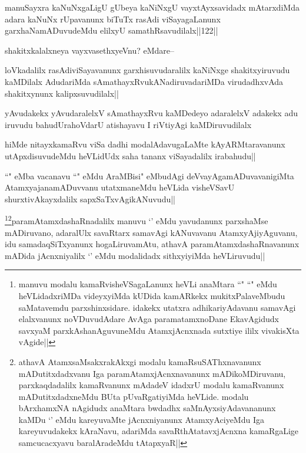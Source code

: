 \begin{artha}
manuSayxra kaNuNxgaLigU gUbeya kaNiNxgU vayxtAyxsavidadx mAtarxdiMda adara kaNuNx rUpavanunx biTuTx rasAdi viSayagaLanunx garxhaNamADuvudeMdu elilxyU samathRsavudilalx||122||
\end{artha}

\begin{artha}
shakitxkalalxneya vayxvasethxyeVnu? eMdare--
\end{artha}

\begin{artha}
loVkadalilx rasAdiviSayavanunx garxhisuvudaralilx kaNiNxge shakitxyiruvudu kaMDilalx AdudariMda sAmathayxRvukANadiruvadariMDa virudadhxvAda shakitxynunx kalipxsuvudilalx||
\end{artha}

\begin{artha}
yAvudakekx yAvudaralelxV sAmathayxRvu kaMDedeyo adaralelxV adakekx adu iruvudu bahudUrahoVdarU atishayavu I riVtiyAgi kaMDiruvudilalx
\end{artha}

\begin{artha}
hiMde nitayxkamaRvu viSa dadhi modalAdavugaLaMte kAyARMtaravanunx utApxdisuvudeMdu heVLidUdx saha tananx viSayadalilx irabahudu||
\end{artha}

\begin{artha}
``\stext" eMba vacanavu ``\stext" eMdu AraMBisi" eMbudAgi  deVvayAgamADuvavanigiMta AtamxyajanamADuvvanu utatxmaneMdu heVLida visheVSavU shurxtivAkayxdalilx sapxSaTxvAgikANuvudu||
\end{artha}

\begin{artha}
\footnote{manuvu modalu kamaRvisheVSagaLanunx heVLi anaMtara ``\stext" ``\stext" eMdu heVLidadxriMDa videyxyiMda kUDida kamARkekx mukitxPalaveMbudu saMatavemdu parxshinxsidare. idakekx utatxra adhikariyAdavanu samavAgi elalxvanunx noVDuvudAdare AvAga paramatamxnoDane EkavAgidudx savxyaM parxkAshanAguvuneMdu AtamxjAcnxnada sutxtiye ililx vivakisXta vAgide||}\footnote{athavA AtamxsaMsakxrakAkxgi modalu kamaRsuSAThxnavanunx mADutitxdadxvanu Iga paramAtamxjAcnxnavanunx  mADikoMDiruvanu, parxkaqdadalilx kamaRvanunx mAdadeV idadxrU modalu kamaRvanunx mADutitxdadxneMdu BUta pUvaRgatiyiMda heVLide. modalu bArxhamxNA nAgidudx anaMtara bwdadhx saMnAyxsiyAdavananunx kaMDu `\stext' eMdu kareyuvaMte jAcnxniyanunx AtamxyAciyeMdu Iga kareyuvudakekx kAraNavu, adariMda savaRthAtatavxjAcnxna kamaRgaLige samcucacxyavu baralAradeMdu tAtapxyaR||}paramAtamxdashaRnadalilx manuvu `\stext' eMdu yavudanunx parxshaMse mADiruvano, adaralUlx savaRtarx samavAgi kANuvavanu AtamxyAjiyAguvanu, idu samadaqSiTxyanunx hogaLiruvamAtu, athavA paramAtamxdashaRnavanunx mADida jAcnxniyalilx `\stext' eMdu modalidadx sithxyiyiMda heVLiruvudu||
\end{artha}

